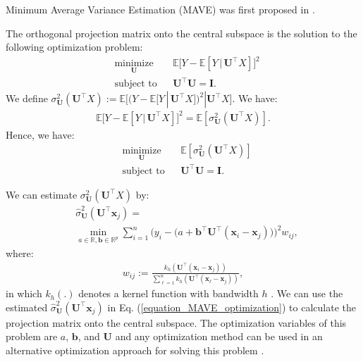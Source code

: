 \documentclass[lang=cn,10pt]{gorgeousnbook}
\numberwithin{equation}{section}%
\numberwithin{figure}{section}%
\begin{document}
Minimum Average Variance Estimation (MAVE) was first proposed in \cite{xia2002adaptive}.

\begin{theorem}[]
The orthogonal projection matrix onto the central subspace is the solution to the following optimization problem:
\begin{equation*}
\begin{aligned}
& \underset{\boldsymbol{U}}{\text{minimize}}
& & \mathbb{E}\big[Y - \mathbb{E}[Y\, |\, \boldsymbol{U}^\top X]\big]^2 \\
& \text{subject to}
& & \boldsymbol{U}^\top \boldsymbol{U} = \boldsymbol{I}.
\end{aligned}
\end{equation*}
We define $\sigma^2_{\boldsymbol{U}} (\boldsymbol{U}^\top X) := \mathbb{E}\big[(Y - \mathbb{E}[Y\, |\, \boldsymbol{U}^\top X])^2 | \boldsymbol{U}^\top X\big]$. We have:
\begin{align*}
\mathbb{E}\big[Y - \mathbb{E}[Y\, |\, \boldsymbol{U}^\top X]\big]^2 = \mathbb{E}[\sigma^2_{\boldsymbol{U}} (\boldsymbol{U}^\top X)].
\end{align*}
Hence, we have:
\begin{equation}\label{equation_MAVE_optimization}
\begin{aligned}
& \underset{\boldsymbol{U}}{\text{minimize}}
& & \mathbb{E}[\sigma^2_{\boldsymbol{U}} (\boldsymbol{U}^\top X)] \\
& \text{subject to}
& & \boldsymbol{U}^\top \boldsymbol{U} = \boldsymbol{I}.
\end{aligned}
\end{equation}
\end{theorem}

We can estimate $\sigma^2_{\boldsymbol{U}} (\boldsymbol{U}^\top X)$ by:
\begin{align*}
&\widehat{\sigma}^2_{\boldsymbol{U}} (\boldsymbol{U}^\top \boldsymbol{x}_j) = \\
&\min_{a \in \mathbb{R}, \boldsymbol{b} \in \mathbb{R}^p} \sum_{i=1}^n \Big(y_i - \big(a + \boldsymbol{b}^\top \boldsymbol{U}^\top (\boldsymbol{x}_i - \boldsymbol{x}_j)\big)\Big)^2 w_{ij},
\end{align*}
where:
\begin{align*}
w_{ij} := \frac{k_h(\boldsymbol{U}^\top (\boldsymbol{x}_i - \boldsymbol{x}_j))}{\sum_{\ell=1}^n k_h(\boldsymbol{U}^\top (\boldsymbol{x}_\ell - \boldsymbol{x}_j))},
\end{align*}
in which $k_h(.)$ denotes a kernel function with bandwidth $h$ \cite{ghojogh2021reproducing}. 
We can use the estimated $\widehat{\sigma}^2_{\boldsymbol{U}} (\boldsymbol{U}^\top \boldsymbol{x}_j)$ in Eq. (\ref{equation_MAVE_optimization}) to calculate the projection matrix onto the central subspace. The optimization variables of this problem are $a$, $\boldsymbol{b}$, and $\boldsymbol{U}$ and any optimization method can be used in an alternative optimization approach for solving this problem \cite{ghojogh2021kkt}.
\end{document}
